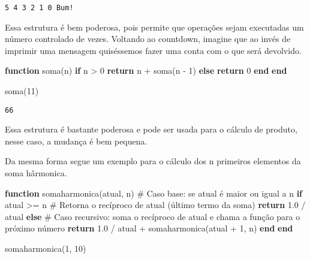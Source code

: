 \documentclass[
  letterpaper,
  DIV=11,
  numbers=noendperiod]{scrreprt}
\newenvironment{Shaded}{\begin{snugshade}}{\end{snugshade}}
\newcommand{\CommentTok}[1]{\textcolor[rgb]{0.37,0.37,0.37}{#1}}
\newcommand{\ControlFlowTok}[1]{\textcolor[rgb]{0.00,0.23,0.31}{\textbf{#1}}}
\newcommand{\FloatTok}[1]{\textcolor[rgb]{0.68,0.00,0.00}{#1}}
\newcommand{\FunctionTok}[1]{\textcolor[rgb]{0.28,0.35,0.67}{#1}}
\newcommand{\KeywordTok}[1]{\textcolor[rgb]{0.00,0.23,0.31}{\textbf{#1}}}
\newcommand{\NormalTok}[1]{\textcolor[rgb]{0.00,0.23,0.31}{#1}}
\newcommand{\OperatorTok}[1]{\textcolor[rgb]{0.37,0.37,0.37}{#1}}
\begin{document}
\begin{verbatim}
5 4 3 2 1 0 Bum!
\end{verbatim}

Essa estrutura é bem poderosa, pois permite que operações sejam
executadas um número controlado de vezes. Voltando ao countdown, imagine
que ao invés de imprimir uma mensagem quiséssemos fazer uma conta com o
que será devolvido.

\begin{Shaded}
\begin{Highlighting}[]
\KeywordTok{function} \FunctionTok{soma}\NormalTok{(n)}
 \ControlFlowTok{if}\NormalTok{ n }\OperatorTok{\textgreater{}} \FloatTok{0}
   \ControlFlowTok{return}\NormalTok{ n }\OperatorTok{+} \FunctionTok{soma}\NormalTok{(n }\OperatorTok{{-}} \FloatTok{1}\NormalTok{)}
 \ControlFlowTok{else}
   \ControlFlowTok{return} \FloatTok{0}
 \ControlFlowTok{end}
\KeywordTok{end}

\FunctionTok{soma}\NormalTok{(}\FloatTok{11}\NormalTok{)}
\end{Highlighting}
\end{Shaded}

\begin{verbatim}
66
\end{verbatim}

Essa estrutura é bastante poderosa e pode ser usada para o cálculo de
produto, nesse caso, a mudança é bem pequena.

Da mesma forma segue um exemplo para o cálculo dos n primeiros elementos
da soma hârmonica.

\begin{Shaded}
\begin{Highlighting}[]
\KeywordTok{function} \FunctionTok{somaharmonica}\NormalTok{(atual, n)}
 \CommentTok{\# Caso base: se \textquotesingle{}atual\textquotesingle{} é maior ou igual a \textquotesingle{}n\textquotesingle{}}
 \ControlFlowTok{if}\NormalTok{ atual }\OperatorTok{\textgreater{}=}\NormalTok{ n}
   \CommentTok{\# Retorna o recíproco de \textquotesingle{}atual\textquotesingle{} (último termo da soma)}
   \ControlFlowTok{return} \FloatTok{1.0} \OperatorTok{/}\NormalTok{ atual}
 \ControlFlowTok{else}
   \CommentTok{\# Caso recursivo: soma o recíproco de \textquotesingle{}atual\textquotesingle{} e chama a função para o próximo número}
   \ControlFlowTok{return} \FloatTok{1.0} \OperatorTok{/}\NormalTok{ atual }\OperatorTok{+} \FunctionTok{somaharmonica}\NormalTok{(atual }\OperatorTok{+} \FloatTok{1}\NormalTok{, n)}
 \ControlFlowTok{end}
\KeywordTok{end}

\FunctionTok{somaharmonica}\NormalTok{(}\FloatTok{1}\NormalTok{, }\FloatTok{10}\NormalTok{)}
\end{Highlighting}
\end{Shaded}
\end{document}
